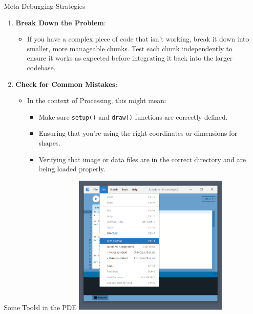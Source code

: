\documentclass[10pt]{beamer}
\begin{document}
\begin{frame}{Meta Debugging Strategies}
    	 \begin{enumerate}
\def\labelenumi{\arabic{enumi}.}
\item
  \textbf{Break Down the Problem}:

  \begin{itemize}
  \item
    If you have a complex piece of code that isn't working, break it
    down into smaller, more manageable chunks. Test each chunk
    independently to ensure it works as expected before integrating it
    back into the larger codebase.
  \end{itemize}
\item
  \textbf{Check for Common Mistakes}:

  \begin{itemize}
  \item
    In the context of Processing, this might mean:

    \begin{itemize}
    \item
      Make sure \texttt{setup()} and \texttt{draw()} functions are
      correctly defined.
    \item
      Ensuring that you're using the right coordinates or dimensions for
      shapes.
    \item
      Verifying that image or data files are in the correct directory
      and are being loaded properly.
    \end{itemize}
  \end{itemize}
\end{enumerate}
\end{frame}


\begin{frame}{Some Toolsl in the PDE}
    	 \includegraphics[height=7cm]{images/auto_for}
\end{frame}
\end{document}
